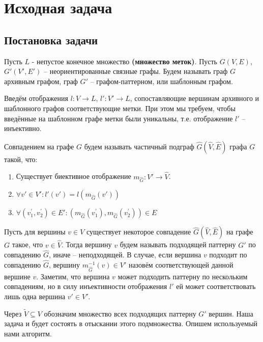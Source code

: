 \section{Исходная задача}

\subsection{Постановка задачи}
\par Пусть $L$ - непустое конечное множество \textbf{(множество меток)}. Пусть $G(V, E)$, $G'(V', E')$ -- неориентированные связные графы. Будем называть граф $G$ архивным графом, граф $G'$ -- графом-паттерном, или шаблонным графом.

Введём отображения $l : V \to L$, $l' : V' \to L$, сопоставляющие вершинам архивного и шаблонного графов соответствующие метки. При этом мы требуем, чтобы введённые на шаблонном графе метки были уникальны, т.е. отображение $l'$ -- инъективно.

\begin{defn}
	Совпадением на графе $G$ будем называть частичный подграф $\widehat{G}(\widehat{V}, \widehat{E})$ графа $G$ такой, что:
	\begin{enumerate}
		\item Существует биективное отображение $m_{\widehat{G}}: V' \to \widehat{V}$.
		\item $\forall v' \in V': l'(v') = l(m_{\widehat{G}}(v'))$
		\item $\forall (v^{\prime}_1, v^{\prime}_2) \in E': (m_{\widehat{G}}(v^{\prime}_1), m_{\widehat{G}}(v^{\prime}_2)) \in E$
	\end{enumerate}
\end{defn} 

Пусть для вершины $v \in V$ существует некоторое совпадение  $\widehat{G}(\widehat{V}, \widehat{E})$ на графе $G$ такое, что $v \in \widehat{V}$. Тогда вершину $v$ будем называть подходящей паттерну $G'$ по совпадению $\widehat{G}$, иначе -- неподходящей. В случае, если вершина $v$ подходит по совпадению $\widehat{G}$, вершину $m_{\widehat{G}}^{-1}(v) \in  V'$ назовём соответствующей данной вершине $v$. Заметим, что вершина $v$ может подходить паттерну по нескольким совпадениям, но в силу инъективности отображения $l'$ ей может соответствовать лишь одна вершина $v' \in  V'$.

Через $\widetilde{V} \subseteq V$ обозначим множество всех подходящих паттерну $G'$ вершин. Наша задача и будет состоять в отыскании этого подмножества. Опишем используемый нами алгоритм.

